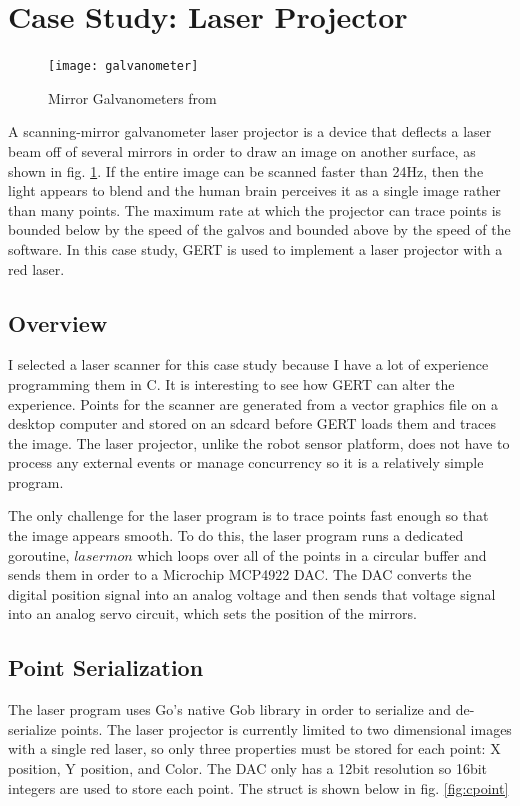 \section{Case Study: Laser Projector}\label{sec:laser}
\begin{figure}[h]
\begin{center}
  \texttt{[image: galvanometer]}
\end{center}
  \caption{Mirror Galvanometers from \cite{scanner}} \label{fig:galvos}
\end{figure}

A scanning-mirror galvanometer laser projector is a device that deflects a laser beam off of several mirrors in
order to draw an image on another surface, as shown in fig. \ref{fig:galvos}. If the entire image can be scanned faster than 24Hz, then the light appears
to blend and the human brain perceives it as a single image rather than many points. The maximum rate at which the
projector can trace points is bounded below by the speed of the galvos and bounded above by the speed of the software.
In this case study, GERT is used to implement a laser projector with a red laser.

\subsection{Overview}
I selected a laser scanner for this case study because I have a lot of experience programming
them in C. It is interesting to see how GERT can alter the experience.
Points for the scanner are generated from a vector graphics file on a desktop computer and stored
on an sdcard before GERT loads them and traces the image. The laser projector,
unlike the robot sensor platform, does not have to process any external events or
manage concurrency so it is a relatively simple program.

The only challenge for the laser program is to trace points fast enough so that the image appears smooth.
To do this, the laser program runs a dedicated goroutine, $lasermon$ which loops over all of the points
in a circular buffer and sends them in order to a Microchip MCP4922 DAC. The
DAC converts the digital position signal into an analog voltage and then
sends that voltage signal into an analog servo circuit, which sets the position
of the mirrors.

\subsection{Point Serialization}
The laser program uses Go's native Gob library in order to serialize and
de-serialize points. The laser projector is currently limited to
two dimensional images with a single red laser, so only three
properties must be stored for each point: X position, Y position,
and Color. The DAC only has a 12bit resolution so 16bit integers are used
to store each point. The struct is shown below in fig. \ref{fig:cpoint}

